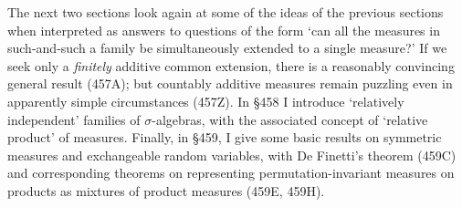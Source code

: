 The next two sections look again at some of the ideas of the
previous sections when interpreted as answers to questions of the form
`can all the measures in such-and-such a family be simultaneously
extended to a single measure?'   If we seek only a {\it finitely}
additive common extension, there is a reasonably convincing general
result (457A);  but countably additive measures remain puzzling even in
apparently simple circumstances (457Z).
In \S458 I introduce `relatively independent' families of
$\sigma$-algebras, with the associated concept of `relative product' of
measures.   Finally, in \S459, I give some basic results on
symmetric measures and exchangeable random variables, with De Finetti's
theorem (459C) and corresponding theorems on representing
permutation-invariant measures on products as mixtures of product
measures (459E, 459H).

\discrpage

